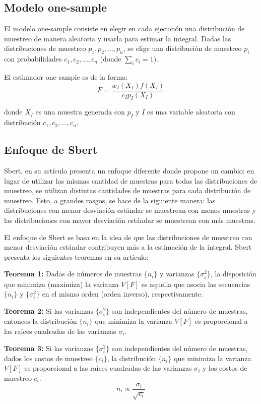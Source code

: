 \documentclass{article}
\begin{document}
\subsection{Modelo one-sample}

El modelo one-sample consiste en elegir en cada ejecución una distribución de muestreo de manera aleatoria y usarla para estimar la integral.
Dadas las distribuciones de muestreo $p_{1}, p_{2}, ..., p_{n}$, se elige una distribución de muestreo $p_{i}$ con probabilidades $c_{1}, c_{2}, ..., c_{n}$ (donde $\sum_{i} c_{i} = 1$).

El estimador one-sample es de la forma:
$$F = \frac{w_{I}(X_{I}) f(X_{I})}{c_{I} p_{I}(X_{I})}$$

donde $X_{I}$ es una muestra generada con $p_{I}$ y $I$ es una variable aleatoria con distribución $c_{1}, c_{2}, ..., c_{n}$.

\subsection{Enfoque de Sbert}

Sbert, en su artículo \cite{Sbert2016} presenta un enfoque diferente donde propone un cambio: en lugar de utilizar las mismas cantidad de muestras para todas las distribuciones de muestreo, se utilizan distintas cantidades de muestras para cada distribución de muestreo.
Esto, a grandes rasgos, se hace de la siguiente manera: las distribuciones con menor desviación estándar se muestrean con menos muestras y las distribuciones con mayor desviación estándar se muestrean con más muestras.

El enfoque de Sbert se basa en la idea de que las distribuciones de muestreo con menor desviación estándar contribuyen más a la estimación de la integral.
Sbert presenta los siguientes teoremas en su artículo:

\textbf{Teorema 1:} Dadas de números de muestras \(\{n_i\}\) y varianzas \(\{\sigma^2_i\}\), la disposición que minimiza (maximiza) la varianza \(V[F]\) es aquella que asocia las secuencias \(\{n_i\}\) y \(\{\sigma^2_i\}\) en el mismo orden (orden inverso), respectivamente.

\textbf{Teorema 2:} Si las varianzas \(\{\sigma^2_i\}\) son independientes del número de muestras, entonces la distribución \(\{n_i\}\) que minimiza la varianza \(V[F]\) es proporcional a las raíces cuadradas de las varianzas \(\sigma_i\).

\textbf{Teorema 3:} Si las varianzas \(\{\sigma^2_i\}\) son independientes del número de muestras, dados los costos de muestreo \(\{c_i\}\), la distribución \(\{n_i\}\) que minimiza la varianza \(V[F]\) es proporcional a las raíces cuadradas de las varianzas \(\sigma_i\) y los costos de muestreo \(c_i\).
$$ n_i \propto \frac{\sigma_i}{\sqrt{c_i}} $$
\end{document}
